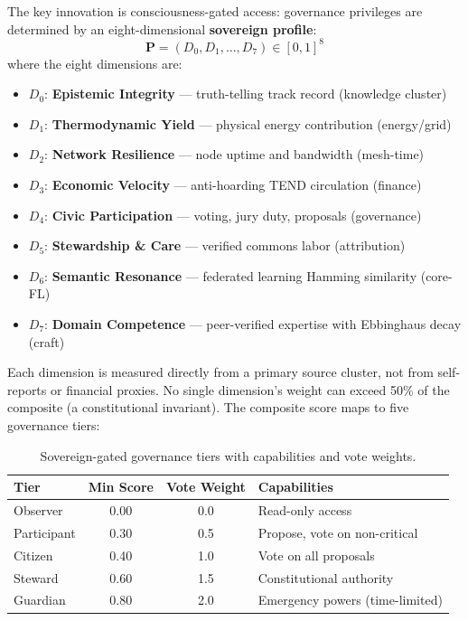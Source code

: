 \documentclass[12pt]{book}
\begin{document}
The key innovation is consciousness-gated access: governance privileges are determined by an eight-dimensional \textbf{sovereign profile}:
\begin{equation}
\mathbf{P} = (D_0, D_1, \ldots, D_7) \in [0, 1]^8
\end{equation}
where the eight dimensions are:
\begin{itemize}[nosep]
  \item $D_0$: \textbf{Epistemic Integrity} --- truth-telling track record (knowledge cluster)
  \item $D_1$: \textbf{Thermodynamic Yield} --- physical energy contribution (energy/grid)
  \item $D_2$: \textbf{Network Resilience} --- node uptime and bandwidth (mesh-time)
  \item $D_3$: \textbf{Economic Velocity} --- anti-hoarding TEND circulation (finance)
  \item $D_4$: \textbf{Civic Participation} --- voting, jury duty, proposals (governance)
  \item $D_5$: \textbf{Stewardship \& Care} --- verified commons labor (attribution)
  \item $D_6$: \textbf{Semantic Resonance} --- federated learning Hamming similarity (core-FL)
  \item $D_7$: \textbf{Domain Competence} --- peer-verified expertise with Ebbinghaus decay (craft)
\end{itemize}

Each dimension is measured directly from a primary source cluster, not from self-reports or financial proxies. No single dimension's weight can exceed 50\% of the composite (a constitutional invariant). The composite score maps to five governance tiers:

\begin{table}[H]
\centering
\caption{Sovereign-gated governance tiers with capabilities and vote weights.}
\label{tab:governance-tiers}
\begin{tabular}{lccl}
\toprule
\textbf{Tier} & \textbf{Min Score} & \textbf{Vote Weight} & \textbf{Capabilities} \\
\midrule
Observer & 0.00 & 0.0 & Read-only access \\
Participant & 0.30 & 0.5 & Propose, vote on non-critical \\
Citizen & 0.40 & 1.0 & Vote on all proposals \\
Steward & 0.60 & 1.5 & Constitutional authority \\
Guardian & 0.80 & 2.0 & Emergency powers (time-limited) \\
\bottomrule
\end{tabular}
\end{table}
\end{document}
